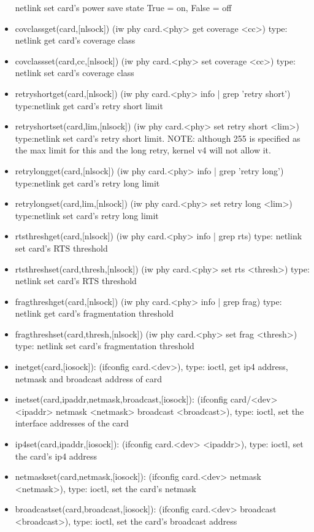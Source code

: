 \documentclass[11pt]{article}
\begin{document}
\begin{appendices}
\begin{itemize}
netlink set card's power save state True = on, False = off
\item covclassget(card,[nlsock]) (iw phy card.<phy> get coverage <cc>) type:
netlink get card's coverage class
\item covclassset(card,cc,[nlsock]) (iw phy card.<phy> set coverage <cc>) type:
netlink set card's coverage class
\item retryshortget(card,[nlsock]) (iw phy card.<phy> info | grep 'retry short')
type:netlink get card's retry short limit
\item retryshortset(card,lim,[nlsock]) (iw phy card.<phy> set retry short <lim>)
type:netlink set card's retry short limit. NOTE: although 255 is specified as the
max limit for this and the long retry, kernel v4 will not allow it.
\item retrylongget(card,[nlsock]) (iw phy card.<phy> info | grep 'retry long')
type:netlink get card's retry long limit
\item retrylongset(card,lim,[nlsock]) (iw phy card.<phy> set retry long <lim>)
type:netlink set card's retry long limit
\item rtsthreshget(card,[nlsock]) (iw phy card.<phy> info | grep rts) type: 
netlink set card's RTS threshold
\item rtsthreshset(card,thresh,[nlsock]) (iw phy card.<phy> set rts <thresh>) type: 
netlink set card's RTS threshold
\item fragthreshget(card,[nlsock]) (iw phy card.<phy> info | grep frag) type: 
netlink get card's fragmentation threshold
\item fragthreshset(card,thresh,[nlsock]) (iw phy card.<phy> set frag <thresh>) type: 
netlink set card's fragmentation threshold
\item inetget(card,[iosock]): (ifconfig card.<dev>), type: ioctl, get ip4 address,
netmask and broadcast address of card
\item inetset(card,ipaddr,netmask,broadcast,[iosock]): (ifconfig card/<dev> <ipaddr>
netmask <netmask> broadcast <broadcast>), type: ioctl, set the interface addresses
of the card
\item ip4set(card,ipaddr,[iosock]): (ifconfig card.<dev> <ipaddr>), type: ioctl,
set the card's ip4 address
\item netmaskset(card,netmask,[iosock]): (ifconfig card.<dev> netmask <netmask>), 
type: ioctl, set the card's netmask
\item broadcastset(card,broadcast,[iosock]): (ifconfig card.<dev> broadcast 
<broadcast>), type: ioctl, set the card's broadcast address

\end{itemize}
\end{appendices}
\end{document}
